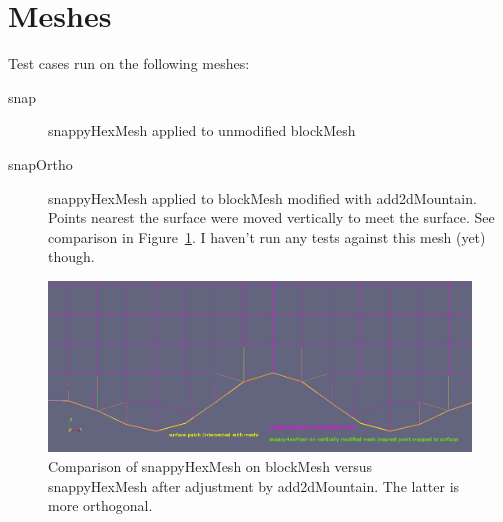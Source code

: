 \section{Meshes}

Test cases run on the following meshes:
\begin{description}
\item[snap]{snappyHexMesh applied to unmodified blockMesh}
\item[snapOrtho]{snappyHexMesh applied to blockMesh modified with add2dMountain.  Points nearest the surface were moved vertically to meet the surface.  See comparison in Figure~\ref{fig:snap-mesh-compare}.  I haven't run any tests against this mesh (yet) though.}
\end{description}

\begin{figure}
\includegraphics[width=\textwidth]{interim-results/cutCellWarpToSurfaceSchaerExp.png}
\caption{Comparison of snappyHexMesh on blockMesh versus snappyHexMesh after adjustment by add2dMountain.  The latter is more orthogonal.}
\label{fig:snap-mesh-compare}
\end{figure}
